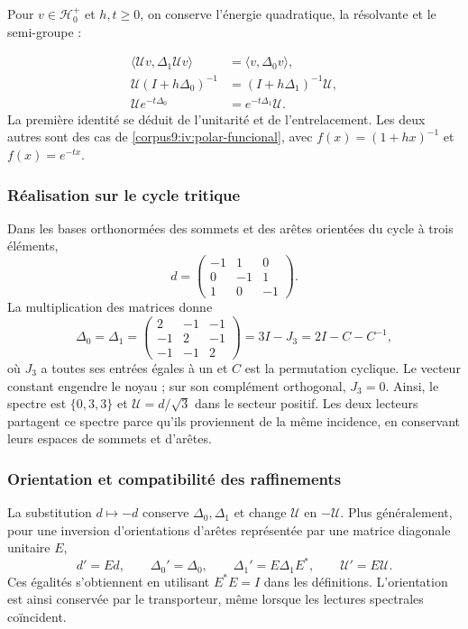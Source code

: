 Pour \(v\in\mathcal H_0^+\) et \(h,t\geq0\), on conserve
l’énergie quadratique, la résolvante et le semi-groupe :

\begin{align}
 \langle\mathcal Uv,\Delta_1\mathcal Uv\rangle
    &=\langle v,\Delta_0v\rangle,\\
 \mathcal U(I+h\Delta_0)^{-1}
    &=(I+h\Delta_1)^{-1}\mathcal U,\\
 \mathcal Ue^{-t\Delta_0}
    &=e^{-t\Delta_1}\mathcal U.
 \label{corpus9:iv:polar-lectores}
\end{align}
La première identité se déduit de l’unitarité et de
l’entrelacement. Les deux autres sont des cas de
\eqref{corpus9:iv:polar-funcional}, avec
\(f(x)=(1+hx)^{-1}\) et \(f(x)=e^{-tx}\).


\subsubsection{Réalisation sur le cycle tritique}
Dans les bases orthonormées des sommets et des arêtes orientées
du cycle à trois éléments,
\[
 d=
 \begin{pmatrix}
 -1&1&0\\
 0&-1&1\\
 1&0&-1
 \end{pmatrix}.
\]
La multiplication des matrices donne
\[
 \Delta_0=\Delta_1=
 \begin{pmatrix}
 2&-1&-1\\
 -1&2&-1\\
 -1&-1&2
 \end{pmatrix}
 =3I-J_3=2I-C-C^{-1},
\]
où \(J_3\) a toutes ses entrées égales à un et \(C\)
est la permutation cyclique. Le vecteur constant engendre le
noyau ; sur son complément orthogonal, \(J_3=0\).
Ainsi, le spectre est \(\{0,3,3\}\) et
\(\mathcal U=d/\sqrt3\) dans le secteur positif.
Les deux lecteurs partagent ce spectre parce qu’ils proviennent de la
même incidence, en conservant leurs espaces de sommets et
d’arêtes.

\subsubsection{Orientation et compatibilité des raffinements
}
La substitution \(d\mapsto-d\) conserve \(\Delta_0,\Delta_1\)
et change \(\mathcal U\) en \(-\mathcal U\). Plus
généralement, pour une inversion d’orientations d’arêtes
représentée par une matrice diagonale unitaire \(E\),
\[
 d'=Ed,\qquad \Delta_0'=\Delta_0,\qquad
 \Delta_1'=E\Delta_1E^*,\qquad \mathcal U'=E\mathcal U.
\]
Ces égalités s’obtiennent en utilisant \(E^*E=I\) dans les
définitions. L’orientation est ainsi conservée par le
transporteur, même lorsque les lectures spectrales
coïncident.


